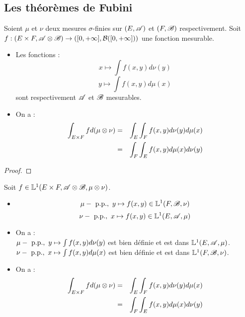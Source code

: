 \subsection{Les théorèmes de Fubini}

\begin{theorem}
	Soient $\mu$ et $\nu$ deux mesures $\sigma$-finies sur $(E, \mathscr{A})$ et $(F, \mathscr{B})$ respectivement.
	Soit $f: (E \times F, \mathscr{A} \otimes \mathscr{B}) \to ([0, +\infty], \mathcal{B}([0, +\infty]))$ une fonction mesurable.

	\begin{itemize}
		\item Les fonctions :
		      $$ x \mapsto \int f(x, y) d \nu(y)$$
		      $$ y \mapsto \int f(x, y) d \mu(x)$$
		      sont respectivement $\mathscr{A}$ et $\mathscr{B}$ mesurables.
		\item On a :
		      \begin{eqnarray*}
			      \int_{E \times F} f d(\mu \otimes \nu) & = & \int_E  \int_F f(x, y) d \nu(y) d \mu(x) \\
			      & = & \int_F  \int_E f(x, y) d \mu(x) d \nu(y)
		      \end{eqnarray*}
	\end{itemize}
\end{theorem}


\begin{proof}
\end{proof}


\begin{theorem}
	Soit $f \in \mathbb{L}^1(E \times F, \mathscr{A} \otimes \mathscr{B}, \mu \otimes \nu)$.

	\begin{itemize}
		\item $$ \mu-\text{ p.p.}, \ y \mapsto f(x, y) \in \mathbb{L}^1(F, \mathscr{B}, \nu)$$
		      $$ \nu-\text{ p.p.}, \ x \mapsto f(x, y) \in \mathbb{L}^1(E, \mathscr{A}, \mu)$$
		\item On a :\\
		      $\mu-\text{ p.p.}, \ y \mapsto \int f(x, y) d \nu(y)$ est bien définie et est dans $\mathbb{L}^1(E, \mathscr{A}, \mu)$.\\
		      $\nu-\text{ p.p.}, \ x \mapsto \int f(x, y) d \mu(x)$ est bien définie et est dans $\mathbb{L}^1(F, \mathscr{B}, \nu)$.
		\item On a :
		      \begin{eqnarray*}
			      \int_{E \times F} f d(\mu \otimes \nu) & = & \int_E  \int_F f(x, y) d \nu(y) d \mu(x) \\
			      & = & \int_F  \int_E f(x, y) d \mu(x) d \nu(y)
		      \end{eqnarray*}
	\end{itemize}
\end{theorem}


